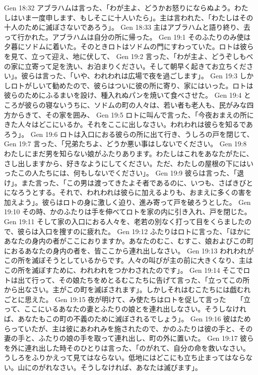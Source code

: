 Gen 18:32  アブラハムは言った、「わが主よ、どうかお怒りにならぬよう。わたしはいま一度申します、もしそこに十人いたら」。主は言われた、「わたしはその十人のために滅ぼさないであろう」。
Gen 18:33  主はアブラハムと語り終り、去って行かれた。アブラハムは自分の所に帰った。
Gen 19:1  そのふたりのみ使は夕暮にソドムに着いた。そのときロトはソドムの門にすわっていた。ロトは彼らを見て、立って迎え、地に伏して、
Gen 19:2  言った、「わが主よ、どうぞしもべの家に立寄って足を洗い、お泊まりください。そして朝早く起きてお立ちください」。彼らは言った、「いや、われわれは広場で夜を過ごします」。
Gen 19:3  しかしロトがしいて勧めたので、彼らはついに彼の所に寄り、家にはいった。ロトは彼らのためにふるまいを設け、種入れぬパンを焼いて食べさせた。
Gen 19:4  ところが彼らの寝ないうちに、ソドムの町の人々は、若い者も老人も、民がみな四方からきて、その家を囲み、
Gen 19:5  ロトに叫んで言った、「今夜おまえの所にきた人々はどこにいるか。それをここに出しなさい。われわれは彼らを知るであろう」。
Gen 19:6  ロトは入口におる彼らの所に出て行き、うしろの戸を閉じて、
Gen 19:7  言った、「兄弟たちよ、どうか悪い事はしないでください。
Gen 19:8  わたしにまだ男を知らない娘がふたりあります。わたしはこれをあなたがたに、さし出しますから、好きなようにしてください。ただ、わたしの屋根の下にはいったこの人たちには、何もしないでください」。
Gen 19:9  彼らは言った、「退け」。また言った、「この男は渡ってきたよそ者であるのに、いつも、さばきびとになろうとする。それで、われわれは彼らに加えるよりも、おまえに多くの害を加えよう」。彼らはロトの身に激しく迫り、進み寄って戸を破ろうとした。
Gen 19:10  その時、かのふたりは手を伸べてロトを家の内に引き入れ、戸を閉じた。
Gen 19:11  そして家の入口におる人々を、老若の別なく打って目をくらましたので、彼らは入口を捜すのに疲れた。
Gen 19:12  ふたりはロトに言った、「ほかにあなたの身内の者がここにおりますか。あなたのむこ、むすこ、娘およびこの町におるあなたの身内の者を、皆ここから連れ出しなさい。
Gen 19:13  われわれがこの所を滅ぼそうとしているからです。人々の叫びが主の前に大きくなり、主はこの所を滅ぼすために、われわれをつかわされたのです」。
Gen 19:14  そこでロトは出て行って、その娘たちをめとるむこたちに告げて言った、「立ってこの所から出なさい。主がこの町を滅ぼされます」。しかしそれはむこたちには戯むれごとに思えた。
Gen 19:15  夜が明けて、み使たちはロトを促して言った　　「立って、ここにいるあなたの妻とふたりの娘とを連れ出しなさい。そうしなければ、あなたもこの町の不義のために滅ぼされるでしょう」。
Gen 19:16  彼はためらっていたが、主は彼にあわれみを施されたので、かのふたりは彼の手と、その妻の手と、ふたりの娘の手を取って連れ出し、町の外に置いた。
Gen 19:17  彼らを外に連れ出した時そのひとりは言った、「のがれて、自分の命を救いなさい。うしろをふりかえって見てはならない。低地にはどこにも立ち止まってはならない。山にのがれなさい。そうしなければ、あなたは滅びます」。
